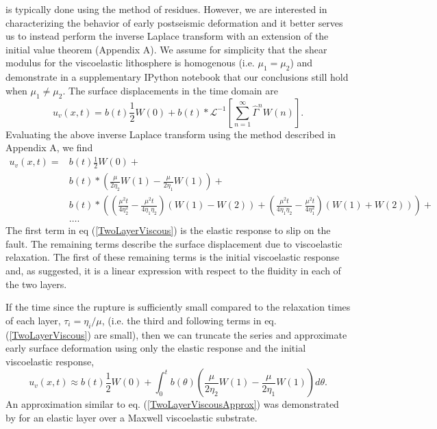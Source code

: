 \documentclass[extra]{gji}
\begin{document}
is typically done using the method of residues. However, we are interested in characterizing
the behavior of early postseismic deformation and it better serves us
to instead perform the inverse Laplace transform with an extension of
the initial value theorem (Appendix A). We assume for simplicity that
the shear modulus for the viscoelastic lithosphere is homogenous
(i.e. $\mu_1 = \mu_2$) and demonstrate in a supplementary IPython
notebook that our conclusions still hold when $\mu_1 \neq \mu_2$.  The
surface displacements in the time domain are
\begin{equation}
 u_v(x,t) = b(t)\frac{1}{2}W(0) + 
            b(t)\ast\mathcal{L}^{-1}\left[\sum_{n=1}^\infty\hat{\Gamma}^{n}W(n)\right].
\end{equation}
Evaluating the above inverse Laplace transform using the method
described in Appendix A, we find 
\begin{align}\label{TwoLayerViscous}
  u_v(x,t) = &b(t)\frac{1}{2}W(0) +\nonumber\\
             &b(t)\ast\left(\frac{\mu}{2\eta_2}W(1) - \frac{\mu}{2\eta_1}W(1)\right) +\nonumber\\
             &b(t)\ast\left(\left(\frac{\mu^2t}{4\eta_2^2} -
                  \frac{\mu^2t}{4\eta_1\eta_2}\right) \left(W(1) - W(2)\right) +
                  \left(\frac{\mu^2t}{4\eta_1\eta_2} - \frac{\mu^2t}{4\eta_1^2}\right)
                  \left(W(1) + W(2)\right)\right) + \nonumber\\ 
             &\dots.
\end{align}
The first term in eq (\ref{TwoLayerViscous}) is the elastic response
to slip on the fault.  The remaining terms describe the surface
displacement due to viscoelastic relaxation.  The first of these
remaining terms is the initial viscoelastic response and, as
suggested, it is a linear expression with respect to the fluidity in
each of the two layers.

If the time since the rupture is sufficiently small compared to the
relaxation times of each layer, $\tau_i=\eta_i/\mu$, (i.e. the third
and following terms in eq. (\ref{TwoLayerViscous}) are small), then we
can truncate the series and approximate early surface deformation
using only the elastic response and the initial viscoelastic response,
\begin{equation}\label{TwoLayerViscousApprox}
 u_v(x,t) \approx b(t)\frac{1}{2}W(0) + 
          \int_0^t b(\theta)\left(\frac{\mu}{2\eta_2}W(1) - 
                  \frac{\mu}{2\eta_1}W(1)\right)d\theta.
\end{equation} 
An approximation similar to eq. (\ref{TwoLayerViscousApprox}) was
demonstrated by \citet{S2010} for an elastic layer over a Maxwell
viscoelastic substrate.  
\end{document}
